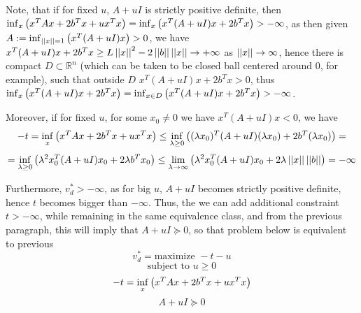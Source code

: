 \documentclass[8pt]{article} %
\begin{document}
\begin{enumerate}[label=\bfseries Problem \arabic*.]
		Note, that if for fixed $u$, $A+uI$ is strictly positive definite, then $\inf_{x}\left(x^TAx+2b^Tx+ux^Tx\right)=
		\inf_x\left(x^T(A+uI)x+2b^Tx\right)>-\infty$, as then given $A:=\inf_{\left|\left|x\right|\right|=1}\left(x^T(A+uI)x\right)>0$, we have
		$x^T(A+uI)x+2b^Tx\geq L\left|\left|x\right|\right|^2-2\left|\left|b\right|\right|\left|\left|x\right|\right|\to+\infty$ as $\left|\left|x\right|\right|\to\infty$, hence there is compact
		$D\subset\mathbb{R}^n$ (which can be taken to be closed ball centered around $0$, for example), such that outside $D$ 
		$x^T(A+uI)x+2b^Tx>0$, thus $\inf_x\left(x^T(A+uI)x+2b^Tx\right)=\inf_{x\in D}\left(x^T(A+uI)x+2b^Tx\right)>-\infty$.

		Moreover, if for fixed $u$, 
		for some  $x_0\neq 0$ we have $x^T(A+uI)x<0$, we have 
		\[-t=\inf_{x}\left(x^TAx+2b^Tx+ux^Tx\right)\leq\inf_{\lambda\geq0}
		\left((\lambda x_0)^T(A+uI)(\lambda x_0)+2b^T(\lambda x_0)\right)=\]
		\[=\inf_{\lambda\geq0}\mybra{\lambda^2x_0^T(A+uI)x_0+2\lambda b^Tx_0}\leq\lim_{\lambda\to\infty}
		\mybra{\lambda^2x_0^T(A+uI)x_0+2\lambda\mynorm{x}\mynorm{b}}=-\infty\]

		Furthermore, $v_d^*>-\infty$, as for big $u$, $A+uI$ becomes strictly positive definite, hence $t$ becomes bigger than
		$-\infty$. Thus, the we can add additional constraint $t>-\infty$, while remaining in the same equivalence class,
		and from the previous paragraph, this will imply that $A+uI\succeq0$, so that problem below is equivalent to previous
		\[v_d^*=\mbox{maximize }-t-u\]
		\[\mbox{subject to }u\geq0\]
		\[-t=\inf_{x}\left(x^TAx+2b^Tx+ux^Tx\right)\]
		\[A+uI\succeq0\]


\end{enumerate}
\end{document}
